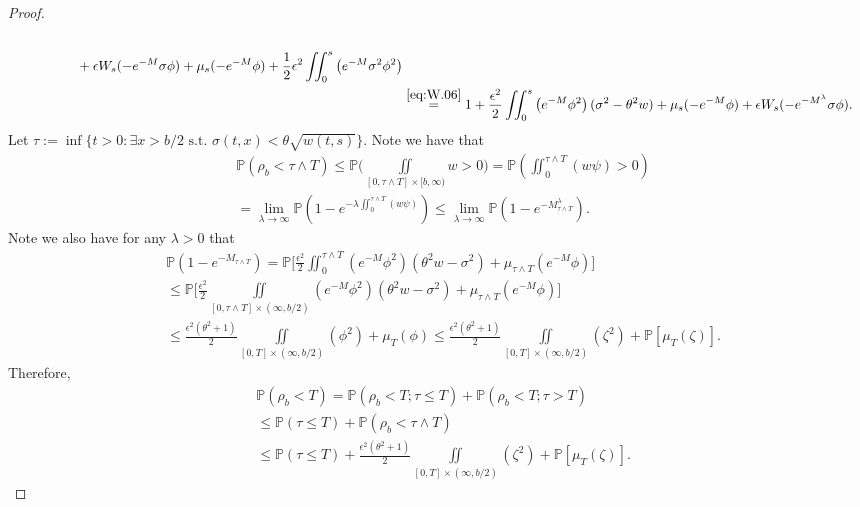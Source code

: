 \documentclass[12pt,a4paper]{amsart}
\numberwithin{equation}{section}
\theoremstyle{plain}
\theoremstyle{remark}
\begin{document}
\begin{proof}
\begin{align}
\begin{multlined}
	\\ \qquad  \qquad + \epsilon W_s(-e^{-M}\sigma\phi) + \mu_s(- e^{-M} \phi )+ \frac{1}{2}\epsilon ^2 \iint_0^s \left(e^{-M} \sigma^2\phi^2 \right)
	\end{multlined}
	\\&\begin{multlined}
	\label{eq:W.4}\overset{\eqref{eq:W.06}}= 1 + \frac{\epsilon^2}{2} \iint_0^s \left(e^{-M} \phi^2\right) (\sigma^2 - \theta^2 w)
	+ \mu_s(- e^{- M}\phi) + \epsilon W_s(-e^{-M^\lambda}\sigma \phi).
	\end{multlined}
	\end{align}
	Let $\tau := \inf\{t>0: \exists x>b/2\text{ s.t. } \sigma(t,x)< \theta \sqrt{w(t,s)}\}$.
	Note we have that
	\begin{align}
	&\mathbb P(\rho_b < \tau \wedge T) \leq \mathbb P\Big(\iint\limits_{[0,\tau \wedge T]\times [b, \infty)} w > 0 \Big)
	= \mathbb P\left(\iint_0^{\tau \wedge T} (w \psi)> 0 \right)
	\\ &= \lim_{\lambda \to \infty} \mathbb P \left( 1 - e^{- \lambda\iint_0^{\tau \wedge T} (w \psi) }\right) 
	\leq \lim_{\lambda \to \infty} \mathbb P\left( 1 - e^{- M_{\tau \wedge T}^\lambda }\right).
	\end{align}
	Note we also have for any $\lambda >0$ that
	\begin{align}
	&\mathbb P( 1 - e^{- M_{\tau \wedge T} }) = \mathbb P \Big[\frac{\epsilon^2}{2} \iint_0^{\tau \wedge T} \left(e^{-M} \phi^2\right) ( \theta^2 w - \sigma^2) + \mu_{\tau \wedge T} (e^{-M}\phi)\Big]
	\\& \leq \mathbb P \Big[\frac{\epsilon^2}{2}\iint\limits_{[0,\tau \wedge T]\times ( \infty, b/2) } (e^{- M} \phi^2 )(\theta^2 w - \sigma^2) + \mu_{\tau \wedge T}(e^{-M}\phi)\Big]
	\\& \leq \frac{\epsilon^2(\theta^2 + 1)}{2} \iint\limits_{[0,T]\times ( \infty, b/2) }(\phi^2) + \mu_T(\phi)
	\leq \frac{\epsilon^2(\theta^2 + 1)}{2} \iint\limits_{[0,T]\times ( \infty, b/2) }(\zeta^2) + \mathbb P [\mu_T(\zeta)].
	\end{align}
	Therefore,
\begin{align}
	&\mathbb P(\rho_b < T) = \mathbb P(\rho_b < T; \tau \leq T) + \mathbb P(\rho_b < T; \tau> T)  
	\\&\leq \mathbb P(\tau \leq T) + \mathbb P(\rho_b <\tau \wedge T)
	\\&\leq \mathbb P(\tau \leq T) + \frac{\epsilon^2(\theta^2 + 1)}{2} \iint\limits_{[0,T]\times ( \infty, b/2) }(\zeta^2) + \mathbb P[\mu_T(\zeta)].
\end{align} 
\end{proof}
\end{document}
